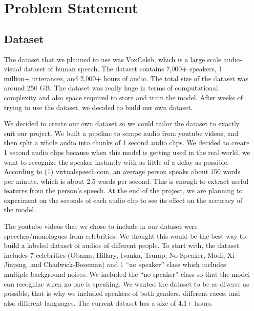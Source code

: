 \documentclass[10pt,twocolumn,letterpaper]{article}
\begin{document}

\section{Problem Statement}

\subsection{Dataset}

The dataset that we planned to use was VoxCeleb, which is a  large scale audio-visual dataset of human speech. The dataset contains 7,000+ speakers, 1 million+ utterances, and 2,000+ hours of audio. The total size of the dataset was around 250 GB. The dataset was really huge in terms of computational complexity and also space required to store and train the model. After weeks of trying to use the dataset, we decided to build our own dataset. 

We decided to create our own dataset so we could tailor the dataset to exactly suit our project. We built a pipeline to scrape audio from youtube videos, and then split a whole audio into chunks of 1 second audio clips. We decided to create 1 second audio clips because when this model is getting used in the real world, we want to recognize the speaker instantly with as little of a delay as possible. According to (1) virtualspeech.com, an average person speaks about 150 words per minute, which is about 2.5 words per second. This is enough to extract useful features from the person’s speech. At the end of the project, we are planning to experiment on the seconds of each audio clip to see its effect on the accuracy of the model. 

The youtube videos that we chose to include in our dataset were speeches/monologues from celebrities. We thought this would be the best way to build a labeled dataset of audios of different people. To start with, the dataset includes 7  celebrities (Obama, Hillary, Ivanka, Trump, No Speaker, Modi, Xi-Jinping, and Chadwick-Boseman) and 1 “no speaker” class which includes multiple background noises. We included the “no speaker” class so that the model can recognize when no one is speaking.  We wanted the dataset to be as diverse as possible, that is why we included speakers of both genders, different races, and also different languages. The current dataset has a size of 4.1+ hours.  
\end{document}

